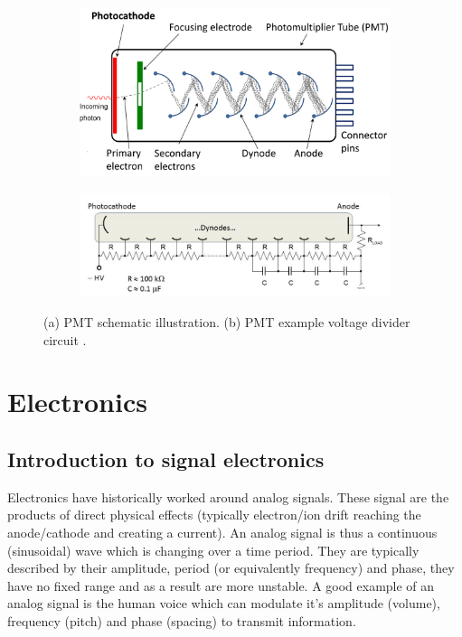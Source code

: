\begin{figure}
\centering
   \begin{subfigure}[t]{0.49\linewidth}
  \centering
   \includegraphics[width=\linewidth]{./fig/PMT.png}
  \caption{}
\label{sfig:PMT}
  \end{subfigure}
   \begin{subfigure}[t]{0.49\linewidth}
  \centering
   \includegraphics[width=\linewidth]{./fig/PMT_Voltage_Divider.jpg}
  \caption{}
\label{sfig:PVD}
  \end{subfigure}
\caption{(a) PMT schematic illustration. (b) PMT example voltage divider circuit \cite{wiki}.}
\label{fig:PMT}
\end{figure}


\section{Electronics}

\subsection{Introduction to signal electronics}

Electronics have historically worked around analog signals. These signal are the products of direct physical effects (typically electron/ion drift reaching the anode/cathode and creating a current). An analog signal is thus a continuous (sinusoidal) wave which is changing over a time period. They are typically described by their amplitude, period (or equivalently frequency) and phase, they have no fixed range and as a result are more unstable. A good example of an analog signal is the human voice which can modulate it's amplitude (volume), frequency (pitch) and phase (spacing) to transmit information. 



